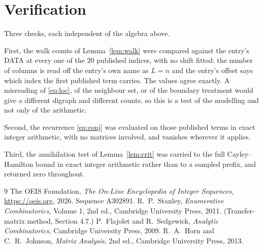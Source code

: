 \documentclass[11pt,a4paper]{article}
\theoremstyle{plain}
\theoremstyle{definition}
\begin{document}
\section{Verification}

Three checks, each independent of the algebra above.

First, the walk counts of Lemma~\ref{lem:walk} were compared against the entry's DATA at
every one of the $20$ published indices, with no shift fitted: the number of columns is
read off the entry's own name as $L=n$ and the entry's offset says which index the first
published term carries. The values agree exactly. A misreading of \eqref{eq:loc}, of the
neighbour set, or of the boundary treatment would give a different digraph and different
counts, so this is a test of the modelling and not only of the arithmetic.

Second, the recurrence \eqref{eq:conj} was evaluated on those published terms in exact
integer arithmetic, with no matrices involved, and vanishes wherever it applies.

Third, the annihilation test of Lemma~\ref{lem:crit} was carried to the full
Cayley--Hamilton bound in exact integer arithmetic rather than to a sampled prefix, and
returned zero throughout.

\begin{thebibliography}{9}
 The OEIS Foundation, \emph{The On-Line Encyclopedia of Integer
Sequences}, \url{https://oeis.org}, 2026. Sequence A302891.
 R.~P.~Stanley, \emph{Enumerative Combinatorics}, Volume 1, 2nd ed.,
Cambridge University Press, 2011. (Transfer-matrix method, Section 4.7.)
 P.~Flajolet and R.~Sedgewick, \emph{Analytic Combinatorics}, Cambridge
University Press, 2009.
 R.~A.~Horn and C.~R.~Johnson, \emph{Matrix Analysis}, 2nd ed., Cambridge
University Press, 2013.
\end{thebibliography}
\end{document}
